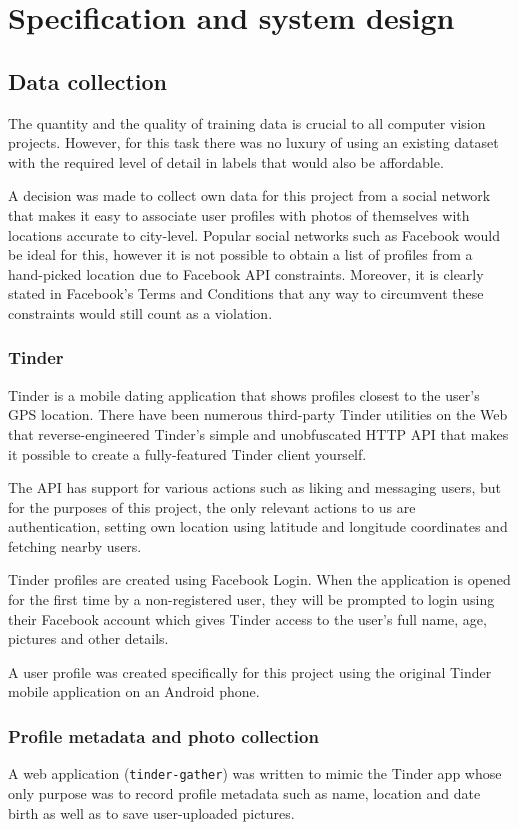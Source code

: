 \chapter{Specification and system design}
\label{spec}
\section{Data collection}
The quantity and the quality of training data is crucial to all computer vision 
projects. However, for this task there was no luxury of using an existing 
dataset with the required level of detail in labels that would also be 
affordable.

A decision was made to collect own data for this project from a social network 
that makes it easy to associate user profiles with photos of themselves with 
locations accurate to city-level. Popular social networks such as Facebook 
would be ideal for this, however it is not possible to obtain a list of 
profiles from a hand-picked location due to Facebook API constraints. 
Moreover, it is clearly stated in Facebook's Terms and Conditions that any way 
to circumvent these constraints would still count as a violation.


\subsection{Tinder}
Tinder is a mobile dating application that shows profiles closest to the 
user's GPS location. There have been numerous third-party Tinder utilities on 
the Web that reverse-engineered Tinder's simple and unobfuscated HTTP API that 
makes it possible to create a fully-featured Tinder client yourself.

The API has support for various actions such as liking and messaging users, 
but for the purposes of this project, the only relevant actions to us are 
authentication, setting own location using latitude and longitude coordinates 
and fetching nearby users.

Tinder profiles are created using Facebook Login. When the application is 
opened for the first time by a non-registered user, they will be prompted to 
login using their Facebook account which gives Tinder access to the user's full name, 
age, pictures and other details.

A user profile was created specifically for this project using the original 
Tinder mobile application on an Android phone. 

\subsection{Profile metadata and photo collection}
A web application (\texttt{tinder-gather}) was written to mimic the Tinder app
whose only purpose was to record profile metadata such as name, location and
date birth as well as to save user-uploaded pictures. 

